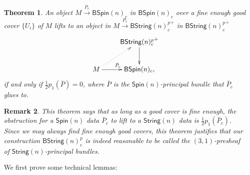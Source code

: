 \documentclass[letterpaper,10pt, oneside]{article} %
\newtheorem{thm}{Theorem}[section]
\newtheorem{rmk}[thm]{Remark}
\newcommand {\emptycomment}[1]{}
\newcommand{\bstringnp}{\mathsf{BString}(n)^p_{c}} %
\newcommand{\String}{\mathsf{String}}%
\newcommand{\Spin}{\mathsf{Spin}}%
\newcommand{\BSpin}{\mathsf{BSpin}}%
\newcommand{\half}{\frac{1}{2}}
\begin{document}
\emptycomment{
Given an object $M\xrightarrow{\bar{P}_c  } \BSpin(n)_c$, the class $\half p_1(\bar{P}_c) \in \check{H}^3_{U_\bullet}(M, \underline{U(1)})$ constructed in Lemma \ref{lem:tech} converges exactly to $\half p_1(\bar{P} )\in H^3(M, \underline{U(1)})\cong H^4(M, \Z)$ when we refine the cover $\{U_i\}$, where $\bar{P}$ is the $\Spin(n)$-principal bundle that $\bar{P}_c$ glues to. In particular, if $\{U_i \}$ is a good cover, then $\half p_1(\bar{P}_c) = \half p_1(\bar{P}) \in \check{H}^3_{U_\bullet}(M, \underline{U(1)})=H^3(M, \underline{U(1)})$.}




\begin{thm} \label{thm:lift}
An object $M\xrightarrow{\bar{P}_c} \mathsf{B}\Spin(n)_c$ in
$\mathsf{B}\Spin(n)_c$ over a fine enough good cover $\{U_i\}$ of $M$ lifts to an object in $M\xrightarrow{P_c}{\bstringnp}^+$ in ${\bstringnp}^+$
\[
\xymatrix{ & {\bstringnp}^+ \ar[d] \\
M \ar@{.>}[ur] \ar[r]^{\bar{P}_c} & \mathsf{B}\Spin(n)_c,
}
\] if and only if $\frac{1}{2} p_1(\bar{P})=0$, where $\bar{P}$ is the $\Spin(n)$-principal bundle that $\bar{P}_c$ glues to.
\end{thm}
\begin{rmk}\label{rmk:lift}
This theorem says that as long as a good cover is fine enough, the obstruction for a $\Spin(n)$ data $\bar{P}_c$ to  lift to a $\String(n)$ data is $\half p_1(\bar{P}_c)$. Since we may always find fine enough good covers, this theorem justifies that our construction $\bstringnp$ is indeed
reasonable to be called the $(3,1)$-presheaf of $\String(n)$-principal
bundles.
\end{rmk}



We first prove some technical lemmas:
\end{document}
